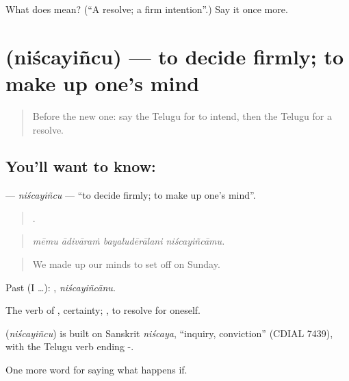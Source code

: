 \begin{tcolorbox}[breakable,colback=teal!4,colframe=teal!35!black,title={Before you move on}]
What does  mean? (\textquotedblleft{}A resolve; a firm intention\textquotedblright{}.) Say it once more.
\end{tcolorbox}
\section[\texorpdfstring{\te{నిశ్చయించు} (niścayiñcu)}{నిశ్చయించు (niścayiñcu)}]{ (niścayiñcu) — to decide firmly; to make up one’s mind}

\label{lesson:TE-C422-niscayincu}



\begin{quote}
Before the new one: say the Telugu for to intend, then the Telugu for a resolve.
\end{quote}

\subsection*{You'll want to know: }
\textbf{} — \emph{niścayiñcu} — \textquotedblleft{}to decide firmly; to make up one’s mind\textquotedblright{}.

\begin{quote}
   .
\end{quote}

\begin{quote}
\emph{mēmu ādivāraṁ bayaludērālani niścayiñcāmu.}
\end{quote}

\begin{quote}
We made up our minds to set off on Sunday.
\end{quote}

Past (I …): , \emph{niścayiñcānu}.

The verb of , certainty; , to resolve for oneself.

\begin{cousinweb}
\textbf{} (\emph{niścayiñcu}) is built on Sanskrit \emph{niścaya}, \textquotedblleft{}inquiry, conviction\textquotedblright{} (CDIAL 7439), with the Telugu verb ending -.
\end{cousinweb}

\begin{grammarlens}[title={What you've built}]
One more word for saying what happens if.
\end{grammarlens}


